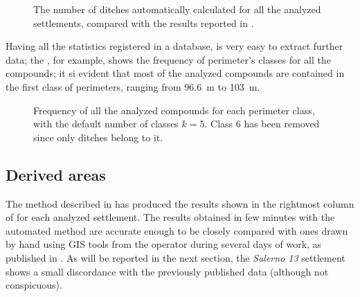            \begin{figure}[H]
                \centering
                \begin{tikzpicture}
                    
                \end{tikzpicture}
                \caption[The number of ditches in \cite{laterza} compared to the results of the proposed method.]{The number of ditches automatically calculated for all the analyzed settlements, compared with the results reported in \cite{laterza}.}
                \label{fig:graph-num-ditch}
            \end{figure}

            Having all the statistics registered in a database, is very easy to extract further data; the , for example, shows the frequency of perimeter's classes for all the compounds; it si evident that most of the analyzed compounds are contained in the first class of perimeters, ranging from \SI{96.6}{\meter} to \SI{103}{\meter}.

            \begin{figure}
                \caption[Frequency of all the analyzed compounds for each perimeter class, with $k=5$.]{Frequency of all the analyzed compounds for each perimeter class, with the default number of classes $k=5$. Class $6$ has been removed since only ditches belong to it.}
                \begin{tikzpicture}
                    
                \end{tikzpicture}
                \label{fig:graph-perim-class}
            \end{figure}

        \subsection{Derived areas\label{sec:derived-areas}}

            The method described in  has produced the results shown in the rightmost column of  for each analyzed settlement. The results obtained in few minutes with the automated method are accurate enough to be closely compared with ones drawn by hand using GIS tools from the operator during several days of work, as published in \cite{laterza}.
            As will be reported in the next section, the \emph{Salerno 13} settlement shows a small discordance with the previously published data (although not conspicuous).

